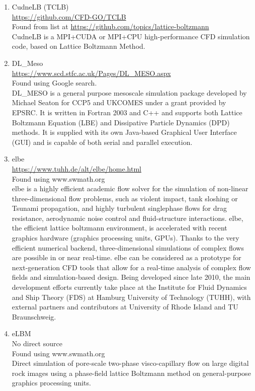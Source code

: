 \documentclass{article}
\begin{document}
\begin{enumerate}
\item CudneLB (TCLB)\\
\href{https://github.com/CFD-GO/TCLB}{https://github.com/CFD-GO/TCLB}\\
Found from list at \href{https://github.com/topics/lattice-boltzmann}{https://github.com/topics/lattice-boltzmann}\\
CudneLB is a MPI+CUDA or MPI+CPU high-performance CFD simulation code, based on Lattice Boltzmann Method.

\item DL\_Meso \\
\href{https://www.scd.stfc.ac.uk/Pages/DL_MESO.aspx}{https://www.scd.stfc.ac.uk/Pages/DL\_MESO.aspx} \\
Found using Google search.\\
DL\_MESO is a general purpose mesoscale simulation package developed by Michael Seaton for CCP5 and UKCOMES​ under a grant provided by EPSRC. It is written in Fortran 2003 and C++ and supports both Lattice Boltzmann Equation (LBE) and Dissipative Particle Dynamics (DPD) methods. It is supplied with its own Java-based Graphical User Interface (GUI) and is capable of both serial and parallel execution.

\item elbe \\
\href{https://www.tuhh.de/alt/elbe/home.html}{https://www.tuhh.de/alt/elbe/home.html}\\
Found using www.swmath.org \\
elbe is a highly efficient academic flow solver for the simulation of non-linear three-dimensional flow problems, such as violent impact, tank sloshing or Tsunami propagation, and highly turbulent singlephase flows for drag resistance, aerodynamic noise control and fluid-structure interactions. elbe, the efficient lattice boltzmann environment, is accelerated with recent graphics hardware (graphics processing units, GPUs). Thanks to the very efficient numerical backend, three-dimensional simulations of complex flows are possible in or near real-time. elbe can be considered as a prototype for next-generation CFD tools that allow for a real-time analysis of complex flow fields and simulation-based design. Being developed since late 2010, the main development efforts currently take place at the Institute for Fluid Dynamics and Ship Theory (FDS) at Hamburg University of Technology (TUHH), with external partners and contributors at University of Rhode Island and TU Braunschweig.

\item eLBM \\
No direct source\\
Found using www.swmath.org \\
Direct simulation of pore-scale two-phase visco-capillary flow on large digital rock images using a phase-field lattice Boltzmann method on general-purpose graphics processing units. 


\end{enumerate}
\end{document}
